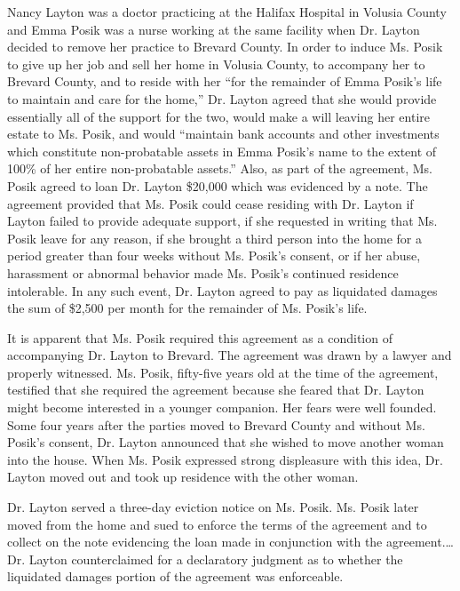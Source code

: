 

Nancy Layton was a doctor practicing at the Halifax Hospital in Volusia County
and Emma Posik was a nurse working at the same facility when Dr. Layton decided
to remove her practice to Brevard County. In order to induce Ms. Posik to give
up her job and sell her home in Volusia County, to accompany her to Brevard
County, and to reside with her ``for the remainder of Emma Posik's life to
maintain and care for the home,'' Dr. Layton agreed that she would provide
essentially all of the support for the two, would make a will leaving her
entire estate to Ms. Posik, and would ``maintain bank accounts and other
investments which constitute non-probatable assets in Emma Posik's name to the
extent of 100\% of her entire non-probatable assets.'' Also, as part of the
agreement, Ms. Posik agreed to loan Dr. Layton \$20,000 which was evidenced by
a note. The agreement provided that Ms. Posik could cease residing with Dr.
Layton if Layton failed to provide adequate support, if she requested in
writing that Ms. Posik leave for any reason, if she brought a third person into
the home for a period greater than four weeks without Ms. Posik's consent, or
if her abuse, harassment or abnormal behavior made Ms. Posik's continued
residence intolerable. In any such event, Dr. Layton agreed to pay as
liquidated damages the sum of \$2,500 per month for the remainder of Ms.
Posik's life.

It is apparent that Ms. Posik required this agreement as a condition of
accompanying Dr. Layton to Brevard. The agreement was drawn by a lawyer and
properly witnessed. Ms. Posik, fifty-five years old at the time of the
agreement, testified that she required the agreement because she feared that
Dr. Layton might become interested in a younger companion. Her fears were well
founded. Some four years after the parties moved to Brevard County and without
Ms. Posik's consent, Dr. Layton announced that she wished to move another woman
into the house. When Ms. Posik expressed strong displeasure with this idea, Dr.
Layton moved out and took up residence with the other woman.

Dr. Layton served a three-day eviction notice on Ms. Posik. Ms. Posik later
moved from the home and sued to enforce the terms of the agreement and to
collect on the note evidencing the loan made in conjunction with the
agreement.\dots Dr. Layton counterclaimed for a declaratory judgment as to
whether the liquidated damages portion of the agreement was enforceable.

